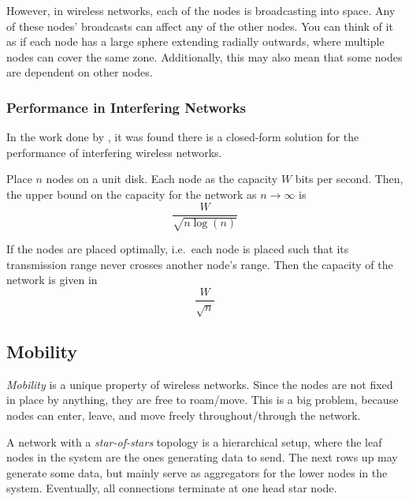 However, in wireless networks, each of the nodes is broadcasting into space.
Any of these nodes' broadcasts can affect any of the other nodes.
You can think of it as if each node has a large sphere extending radially outwards, where multiple nodes can cover the same zone.
Additionally, this may also mean that some nodes are dependent on other nodes.

\subsubsection{Performance in Interfering Networks}\label{subsubsec:Performance_Interfering_Networks}
In the work done by \citeauthor{Wireless_Network_Capacity}, it was found there is a closed-form solution for the performance of interfering wireless networks.

Place $n$ nodes on a unit disk.
Each node as the capacity $W$ bits per second.
Then, the upper bound on the capacity for the network as $n \rightarrow \infty$ is
\begin{equation}\label{eq:Wireless_Network_Capacity_Upper_Bound}
  \frac{W}{\sqrt{n \log(n)}}
\end{equation}

If the nodes are placed optimally, i.e.\ each node is placed such that its transmission range never crosses another node's range.
Then the capacity of the network is given in 
\begin{equation}\label{eq:Wireless_Network_Capacity_Optimal}
  \frac{W}{\sqrt{n}}
\end{equation}

\subsection{Mobility}\label{subsec:Wireless_Mobility}
\begin{definition}[Mobility]\label{def:Mobility}
  \emph{Mobility} is a unique property of wireless networks.
  Since the nodes are not fixed in place by anything, they are free to roam/move.
  This is a big problem, because nodes can enter, leave, and move freely throughout/through the network.
\end{definition}

\begin{definition}\label{def:Star_of_Stars}
  A network with a \emph{star-of-stars} topology is a hierarchical setup, where the leaf nodes in the system are the ones generating data to send.
  The next rows up may generate some data, but mainly serve as aggregators for the lower nodes in the system.
  Eventually, all connections terminate at one head star node.
\end{definition}

